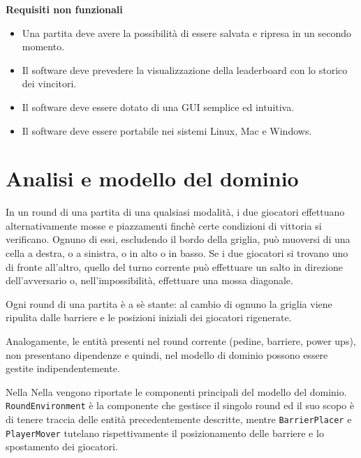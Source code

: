 \documentclass[a4paper,12pt]{report}
\begin{document}
	\textbf{Requisiti non funzionali}
	\begin{itemize}
	\item Una partita deve avere la possibilità di essere salvata e ripresa in un secondo momento.
	\item Il software deve prevedere la visualizzazione della leaderboard con lo storico dei vincitori.
		\item Il software deve essere dotato di una GUI semplice ed intuitiva.
	\item Il software deve essere portabile nei sistemi Linux, Mac e Windows.
	\end{itemize}
	
	\section{Analisi e modello del dominio}
	In un round di una partita di una qualsiasi modalità, i due giocatori effettuano alternativamente mosse e piazzamenti finchè certe condizioni di vittoria si verificano. Ognuno di essi, escludendo il bordo della griglia, può muoversi di una cella a destra, o a sinistra, o in alto o in basso. 
	Se i due giocatori si trovano uno di fronte all'altro, quello del turno corrente può effettuare un salto in direzione dell'avversario o, nell'impossibilità, effettuare una mossa diagonale.
	
	Ogni round di una partita è a sè stante: al cambio di ognuno la griglia viene ripulita dalle barriere e le posizioni iniziali dei giocatori rigenerate. 
	
	Analogamente, le entità presenti nel round corrente (pedine, barriere, power ups), non presentano dipendenze e quindi, nel modello di dominio possono essere gestite indipendentemente.
	
	Nella Nella  vengono riportate le componenti principali del modello del dominio. \texttt{RoundEnvironment} è la componente che gestisce il singolo round ed il suo scopo è di tenere traccia delle entità precedentemente descritte, mentre \texttt{BarrierPlacer} e \texttt{PlayerMover} tutelano rispettivamente il posizionamento delle barriere e lo spostamento dei giocatori. 
	
\end{document}

